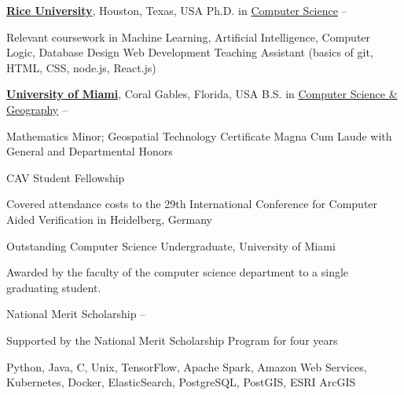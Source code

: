 \documentclass[letterpaper,MMMyyyy,nonstopmode]{simpleresumecv}
\begin{document}
\begin{Body}


\Entry
\href{http://www.rice.edu/}{\textbf{Rice University}},
Houston, Texas, USA
\Gap
\BulletItem
Ph.D. in \href{http://www.cs.rice.edu/}{Computer Science}
\hfill
{} --
\begin{Detail}
\SubBulletItem Relevant coursework in Machine Learning, Artificial Intelligence, Computer Logic, Database Design
\SubBulletItem Web Development Teaching Assistant (basics of git, HTML, CSS, node.js, React.js)
\end{Detail}

\BigGap

\Entry
\href{http://welcome.miami.edu/}{\textbf{University of Miami}},
Coral Gables, Florida, USA
\Gap
\BulletItem
B.S. in \href{http://www.as.miami.edu/csc/}{Computer Science \& Geography}
\hfill
{} -- 
\begin{Detail}
\SubBulletItem Mathematics Minor; Geospatial Technology Certificate
\SubBulletItem Magna Cum Laude with General and Departmental Honors
\end{Detail}



\Gap
\BulletItem CAV Student Fellowship
\hfill
{}
\begin{Detail}
\Item Covered attendance costs to the 29th International Conference for Computer Aided Verification in Heidelberg, Germany
\end{Detail}

\Gap
\BulletItem Outstanding Computer Science Undergraduate, University of Miami
\hfill
{}
\begin{Detail}
\Item Awarded by the faculty of the computer science department to a single graduating student.
\end{Detail}

\Gap
\BulletItem National Merit Scholarship
\hfill
{} -- 
\begin{Detail}
\Item Supported by the National Merit Scholarship Program for four years
\end{Detail}


\Entry Python, Java, C, Unix, TensorFlow, Apache Spark, Amazon Web Services, Kubernetes, Docker, ElasticSearch, PostgreSQL, PostGIS, ESRI ArcGIS

\end{Body}
\end{document}
